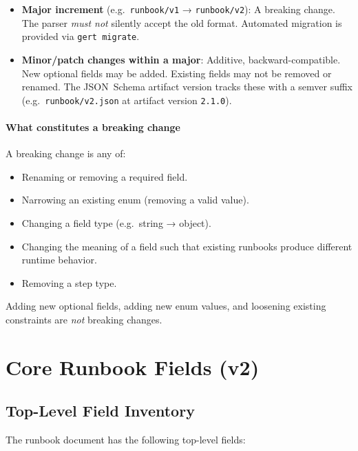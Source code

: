 \begin{itemize}
  \item \textbf{Major increment} (e.g.\ \texttt{runbook/v1} → \texttt{runbook/v2}):
        A breaking change.  The parser \emph{must not} silently accept the old
        format.  Automated migration is provided via \texttt{gert migrate}.
  \item \textbf{Minor/patch changes within a major}: Additive, backward-compatible.
        New optional fields may be added.  Existing fields may not be removed or
        renamed.  The JSON~Schema artifact version tracks these with a semver
        suffix (e.g.\ \texttt{runbook/v2.json} at artifact version
        \texttt{2.1.0}).
\end{itemize}

\paragraph{What constitutes a breaking change}

A breaking change is any of:
\begin{itemize}
  \item Renaming or removing a required field.
  \item Narrowing an existing enum (removing a valid value).
  \item Changing a field type (e.g.\ string → object).
  \item Changing the meaning of a field such that existing runbooks produce
        different runtime behavior.
  \item Removing a step type.
\end{itemize}

Adding new optional fields, adding new enum values, and loosening existing
constraints are \emph{not} breaking changes.



\section{Core Runbook Fields (v2)}
\label{sec:core-fields}

\subsection{Top-Level Field Inventory}
\label{subsec:field-inventory}

The runbook document has the following top-level fields:

